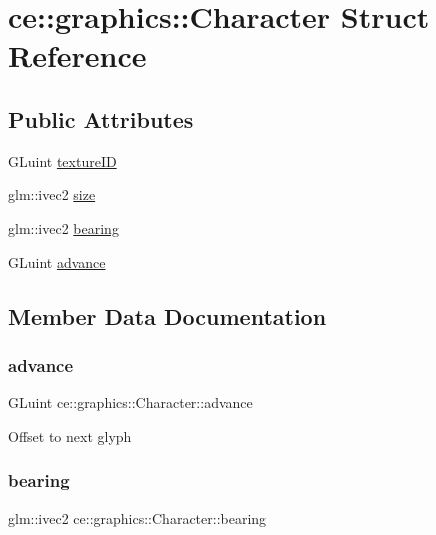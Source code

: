 \hypertarget{structce_1_1graphics_1_1_character}{}\section{ce\+:\+:graphics\+:\+:Character Struct Reference}
\label{structce_1_1graphics_1_1_character}
\subsection*{Public Attributes}
\begin{DoxyCompactItemize}
\item 
G\+Luint \hyperlink{structce_1_1graphics_1_1_character_ae9dae9443cf985d2e0ee4974ea3a434c}{texture\+ID}
\item 
glm\+::ivec2 \hyperlink{structce_1_1graphics_1_1_character_a6d9408d38c787d6c158db425d2595a02}{size}
\item 
glm\+::ivec2 \hyperlink{structce_1_1graphics_1_1_character_ac4a2c763131a527a79c23607cb3b3218}{bearing}
\item 
G\+Luint \hyperlink{structce_1_1graphics_1_1_character_a9b312a5f9889da34a8406d7193b30961}{advance}
\end{DoxyCompactItemize}


\subsection{Member Data Documentation}
\mbox{\label{structce_1_1graphics_1_1_character_a9b312a5f9889da34a8406d7193b30961}} 
\subsubsection{\texorpdfstring{advance}{advance}}
{\footnotesize\ttfamily G\+Luint ce\+::graphics\+::\+Character\+::advance}

Offset to next glyph \mbox{\label{structce_1_1graphics_1_1_character_ac4a2c763131a527a79c23607cb3b3218}} 
\subsubsection{\texorpdfstring{bearing}{bearing}}
{\footnotesize\ttfamily glm\+::ivec2 ce\+::graphics\+::\+Character\+::bearing}


